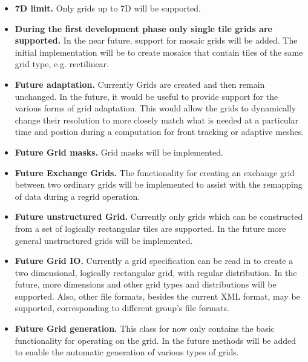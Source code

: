 

\begin{itemize}

\item {\bf 7D limit.}  Only grids up to 7D will be supported.

\item {\bf During the first development phase only single
tile grids are supported.}  In the near future, support
for mosaic grids will be added.  The initial implementation 
will be to create mosaics that contain tiles of the same
grid type, e.g. rectilinear.

\item {\bf Future adaptation.}  Currently Grids
are created and then remain unchanged. In the future, it would
be useful to provide support for the various forms of grid
adaptation. This would allow the grids to dynamically change
their resolution to more closely match what is needed at a particular
time and postion during a computation for front tracking or adaptive meshes.

\item {\bf Future Grid masks.}  Grid masks will be implemented.

\item {\bf Future Exchange Grids.}  The functionality for creating an 
exchange grid between two ordinary grids will be implemented
to assist with the remapping of data during a regrid operation. 

\item {\bf Future unstructured Grid.}  Currently only grids which can be constructed from a set of logically rectangular tiles are supported. In the future more general unstructured grids will be implemented.

\item {\bf Future Grid IO.} Currently a grid specification can be read in to create a two dimensional, logically rectangular grid, with regular distribution.  In the future, more dimensions and other grid types and distributions will be supported. Also, other file formats, besides the current XML format, may be supported, corresponding to different group's file formats.

\item {\bf Future Grid generation.} This class for now only contains
the basic functionality for operating on the grid. In the future
methods will be added to enable the automatic generation of various types of
grids. 


\end{itemize}

